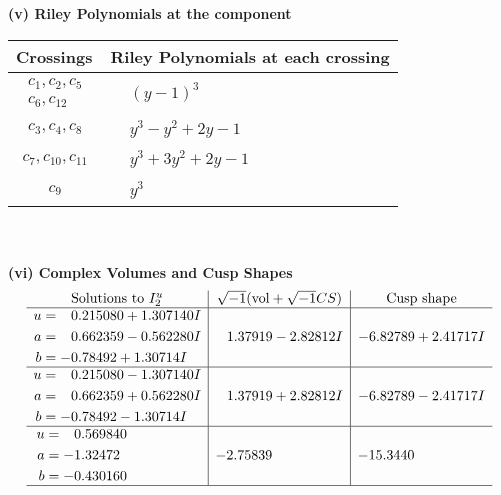 \documentclass[1p]{elsarticle_modified}
\theoremstyle{definition}
\newcommand{\I}{\sqrt{-1}}
\begin{document}
\newpage\renewcommand{\arraystretch}{1}
\flushleft \textbf{(v) Riley Polynomials at the component}\newline \\
\begin{tabular}{m{50pt}|m{274pt}}
Crossings & \hspace{64pt}Riley Polynomials at each crossing \\
\hline $$\begin{aligned}c_{1},c_{2},c_{5}\\c_{6},c_{12}\end{aligned}$$&$\begin{aligned}
&(y-1)^3
\end{aligned}$\\
\hline $$\begin{aligned}c_{3},c_{4},c_{8}\end{aligned}$$&$\begin{aligned}
&y^3- y^2+2 y-1
\end{aligned}$\\
\hline $$\begin{aligned}c_{7},c_{10},c_{11}\end{aligned}$$&$\begin{aligned}
&y^3+3 y^2+2 y-1
\end{aligned}$\\
\hline $$\begin{aligned}c_{9}\end{aligned}$$&$\begin{aligned}
&y^3
\end{aligned}$\\
\hline
\end{tabular}\\~\\
\newpage\flushleft \textbf{(vi) Complex Volumes and Cusp Shapes}
$$\begin{array}{c|c|c}  
\text{Solutions to }I^u_{2}& \I (\text{vol} + \sqrt{-1}CS) & \text{Cusp shape}\\
 \hline 
\begin{aligned}
u &= \phantom{-}0.215080 + 1.307140 I \\
a &= \phantom{-}0.662359 - 0.562280 I \\
b &= -0.78492 + 1.30714 I\end{aligned}
 & \phantom{-}1.37919 - 2.82812 I & -6.82789 + 2.41717 I \\ \hline\begin{aligned}
u &= \phantom{-}0.215080 - 1.307140 I \\
a &= \phantom{-}0.662359 + 0.562280 I \\
b &= -0.78492 - 1.30714 I\end{aligned}
 & \phantom{-}1.37919 + 2.82812 I & -6.82789 - 2.41717 I \\ \hline\begin{aligned}
u &= \phantom{-}0.569840\phantom{ +0.000000I} \\
a &= -1.32472\phantom{ +0.000000I} \\
b &= -0.430160\phantom{ +0.000000I}\end{aligned}
 & -2.75839\phantom{ +0.000000I} & -15.3440\phantom{ +0.000000I}\\
 \hline 
 \end{array}$$\newpage
\end{document}
